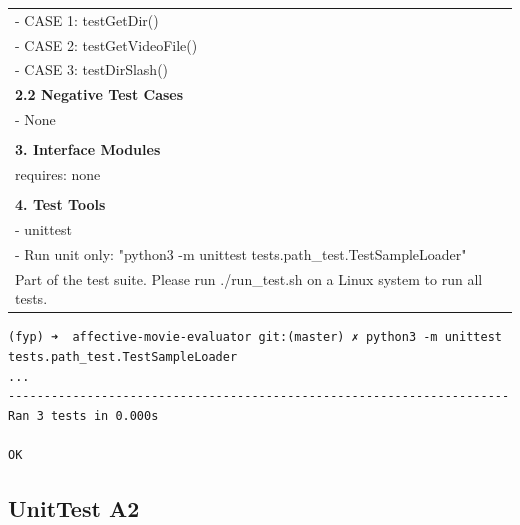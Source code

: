 \documentclass[12pt,a4paper,man]{report}
\begin{document}
\begin{longtable}{|p{7in}|}
\hline
- CASE 1: testGetDir()\\
- CASE 2: testGetVideoFile()\\
- CASE 3: testDirSlash()\\
\hline
\textbf{2.2 Negative Test Cases}\\
\hline
- None\\
\\
\hline
\textbf{3. Interface Modules}\\
\hline
requires: none\\
\\
\hline
\textbf{4. Test Tools}\\
\hline
- unittest\\
- Run unit only: "python3 -m unittest tests.path\_test.TestSampleLoader"\\
Part of the test suite. Please run ./run\_test.sh on a Linux system to run all tests.\\
\hline
\end{longtable}

\begin{verbatim}
(fyp) ➜  affective-movie-evaluator git:(master) ✗ python3 -m unittest tests.path_test.TestSampleLoader
...
----------------------------------------------------------------------
Ran 3 tests in 0.000s

OK
\end{verbatim}

\subsection{UnitTest A2}
\label{sec:orgb4cbdab}
\end{document}
